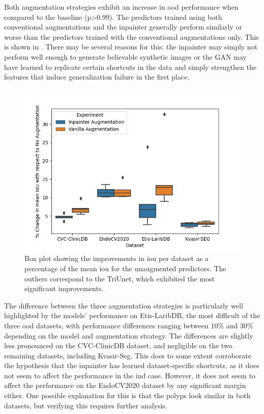 Both augmentation strategies exhibit an increase in \gls{ood} performance when compared to the baseline (p>0.99). The predictors trained using both conventional augmentations and the inpainter generally perform similarly or worse than the predictors trained with the conventional augmentations only. This is shown in . There may be several reasons for this: the inpainter may simply not perform well enough to generate believable synthetic images or the GAN may have learned to replicate certain shortcuts in the data and simply strengthen the features that induce generalization failure in the first place.

\begin{figure}[ht]
    \centering
    \includegraphics[width=\linewidth]{illustrations/augmentation_plot.png}
    \caption{Box plot showing the improvements in \gls{iou} per dataset as a percentage of the mean \gls{iou} for the unaugmented predictors. The outliers correspond to the TriUnet, which exhibited the most significant improvements.}
    \label{fig:augmentations}
\end{figure}

The difference between the three augmentation strategies is particularly well highlighted by the models' performance on Etis-LaribDB, the most difficult of the three \gls{ood} datasets, with performance differences ranging between 10\% and 30\% depending on the model and augmentation strategy. The differences are slightly less pronounced on the CVC-ClinicDB dataset, and negligible on the two remaining datasets, including Kvasir-Seg. This does to some extent corroborate the hypothesis that the inpainter has learned dataset-specific shortcuts, as it does not seem to affect the performance in the \gls{ind} case. However, it does not seem to affect the performance on the EndoCV2020 dataset by any significant margin either. One possible explanation for this is that the polyps look similar in both datasets, but verifying this requires further analysis. 

